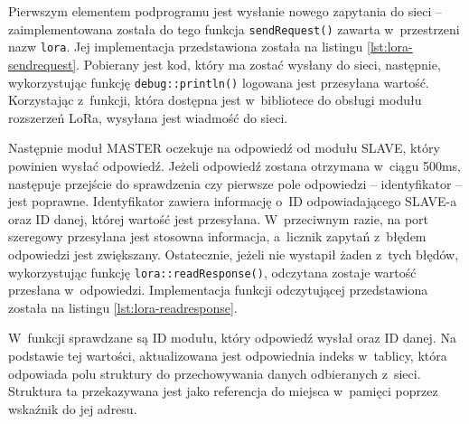 Pierwszym elementem podprogramu jest wysłanie nowego zapytania do sieci -- zaimplementowana została do tego funkcja
\texttt{sendRequest()} zawarta w~przestrzeni nazw \texttt{lora}. Jej implementacja przedstawiona została na listingu
\ref{lst:lora-sendrequest}. Pobierany jest kod, który ma zostać wysłany do sieci, następnie, wykorzystując funkcję
\texttt{debug::println()} logowana jest przesyłana wartość. Korzystając z~funkcji, która dostępna jest w~bibliotece do
obsługi modułu rozszerzeń LoRa, wysyłana jest wiadmość do sieci.



Następnie moduł MASTER oczekuje na odpowiedź od modułu SLAVE, który powinien wysłać odpowiedź. Jeżeli odpowiedź zostana
otrzymana w~ciągu 500ms, następuje przejście do sprawdzenia czy pierwsze pole odpowiedzi -- identyfikator -- jest
poprawne. Identyfikator zawiera informację o~ID odpowiadającego SLAVE-a oraz ID danej, której wartość jest przesyłana.
W~przeciwnym razie, na port szeregowy przesyłana jest stosowna informacja, a~licznik zapytań z~błędem odpowiedzi jest
zwiększany. Ostatecznie, jeżeli nie wystapił żaden z~tych błędów, wykorzystując funkcję \texttt{lora::readResponse()},
odczytana zostaje wartość przesłana w~odpowiedzi. Implementacja funkcji odczytującej przedstawiona została na listingu
\ref{lst:lora-readresponse}.



W~funkcji sprawdzane są ID modułu, który odpowiedź wysłał oraz ID danej. Na podstawie tej wartości, aktualizowana jest
odpowiednia indeks w~tablicy, która odpowiada polu struktury do przechowywania danych odbieranych z~sieci. Struktura ta
przekazywana jest jako referencja do miejsca w~pamięci poprzez wskaźnik do jej adresu.

